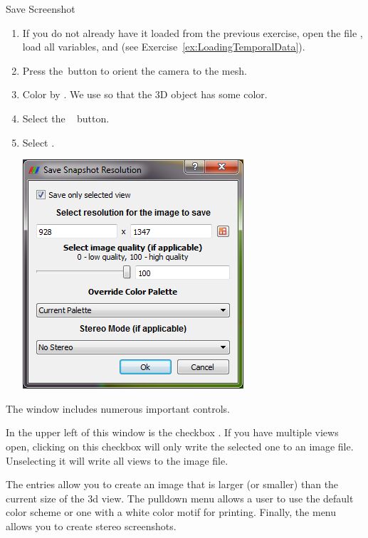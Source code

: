 \begin{exercise}{Save Screenshot}
  \label{ex:SaveScreenshot}%
  \begin{enumerate}
  \item If you do not already have it loaded from the previous exercise,
    open the file , load all variables, and \apply (see
    Exercise~\ref{ex:LoadingTemporalData}).
  \item Press the~\yPlus button to orient the camera to the mesh.
  \item Color by .  We use  so that the
    3D object has some color.
  \item Select the ~ button.
  \item Select  \ra {}.

  \begin{inlinefig}
    \includegraphics[width=.8\scw]{images/SaveScreenshot1}
  \end{inlinefig}

  \savecounter
  \end{enumerate}

  The  window includes numerous important controls.  
  
  In the upper left of this window is the checkbox 
  .  If you have multiple views open, 
  clicking on this checkbox will only write the selected one to an image file.
  Unselecting it will write all views to the image file.

  The  entries allow you to
  create an image that is larger (or smaller) than the current size of the
  3d view.  The  pulldown menu allows a user to
  use the default color scheme or one with a white color motif for
  printing.  Finally, the  menu allows you
  to create stereo screenshots.


\end{exercise}
